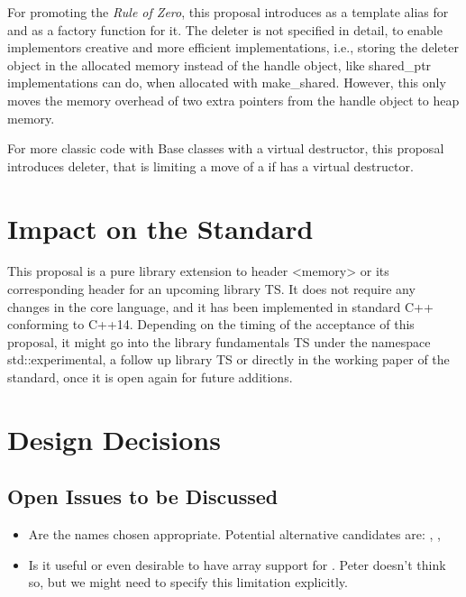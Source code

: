 \documentclass[ebook,11pt,article]{memoir}
\begin{document}
For promoting the \emph{Rule of Zero}, this proposal introduces  as a template alias for  and  as a factory function for it. The  deleter is not specified in detail, to enable implementors creative and more efficient implementations, i.e., storing the deleter object in the allocated memory instead of the handle object, like shared_ptr implementations can do, when allocated with make_shared. However, this only moves the memory overhead of two extra pointers from the handle object to heap memory.

For more classic code with Base classes with a virtual destructor, this proposal introduces  deleter, that is limiting a  move of a  if  has a virtual destructor.

\chapter{Impact on the Standard}
This proposal is a pure library extension to header <memory> or its corresponding header for an upcoming library TS.  It does not require any changes in the core language, and it has been implemented in standard C++ conforming to C++14. Depending on the timing of the acceptance of this proposal, it might go into the library fundamentals TS under the namespace std::experimental, a follow up library TS or directly in the working paper of the standard, once it is open again for future additions.

\chapter{Design Decisions}

\section{Open Issues to be Discussed}
\begin{itemize}
\item Are the names chosen appropriate. Potential alternative candidates are: , , 
\item Is it useful or even desirable to have array support for . Peter doesn't think so, but we might need to specify this limitation explicitly.
\end{itemize}
\end{document}
